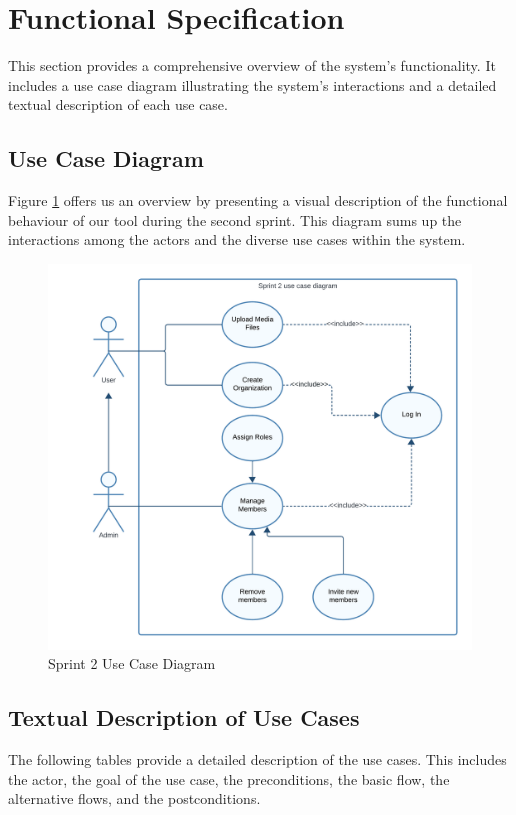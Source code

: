 \section{Functional Specification}

This section provides a comprehensive overview of the system's functionality. It includes a use case diagram illustrating the system's interactions and a detailed textual description of each use case.

\subsection{Use Case Diagram}

Figure \ref{fig:Sprint 2 Use Case Diagram} offers us an overview by presenting a visual description of the functional
behaviour of our tool during the second sprint. This diagram sums up the interactions among the actors and the
diverse use cases within the system.

\begin{figure}[ht]
	\centering
	\includegraphics[width=\linewidth]{Images/sprint2/use case diagram.png}
	\caption{Sprint 2 Use Case Diagram}
	\label{fig:Sprint 2 Use Case Diagram}
\end{figure}

\clearpage

\subsection{Textual Description of Use Cases}
The following tables provide a detailed description of the use cases. This includes the actor, the goal of the use case, the preconditions, the basic flow, the alternative flows, and the postconditions.

